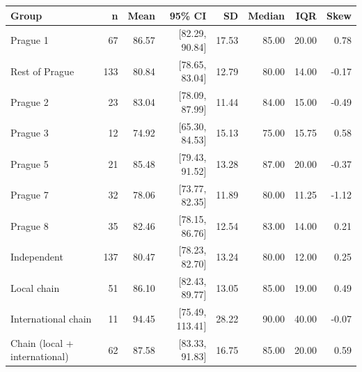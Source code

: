 \begin{tabular}{lrrrrrrr}
  \toprule
Group & n & Mean & 95\% CI & SD & Median & IQR & Skew \\ 
  \midrule
Prague 1 & 67 & 86.57 & [82.29, 90.84] & 17.53 & 85.00 & 20.00 & 0.78 \\ 
  Rest of Prague & 133 & 80.84 & [78.65, 83.04] & 12.79 & 80.00 & 14.00 & -0.17 \\ 
  Prague 2 & 23 & 83.04 & [78.09, 87.99] & 11.44 & 84.00 & 15.00 & -0.49 \\ 
  Prague 3 & 12 & 74.92 & [65.30, 84.53] & 15.13 & 75.00 & 15.75 & 0.58 \\ 
  Prague 5 & 21 & 85.48 & [79.43, 91.52] & 13.28 & 87.00 & 20.00 & -0.37 \\ 
  Prague 7 & 32 & 78.06 & [73.77, 82.35] & 11.89 & 80.00 & 11.25 & -1.12 \\ 
  Prague 8 & 35 & 82.46 & [78.15, 86.76] & 12.54 & 83.00 & 14.00 & 0.21 \\ 
  Independent & 137 & 80.47 & [78.23, 82.70] & 13.24 & 80.00 & 12.00 & 0.25 \\ 
  Local chain & 51 & 86.10 & [82.43, 89.77] & 13.05 & 85.00 & 19.00 & 0.49 \\ 
  International chain & 11 & 94.45 & [75.49, 113.41] & 28.22 & 90.00 & 40.00 & -0.07 \\ 
  Chain (local + international) & 62 & 87.58 & [83.33, 91.83] & 16.75 & 85.00 & 20.00 & 0.59 \\ 
   \bottomrule
\end{tabular}
